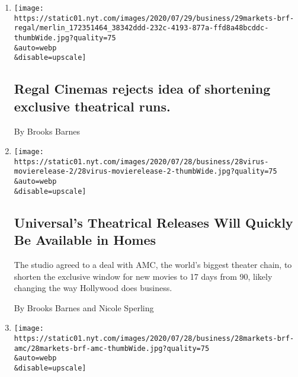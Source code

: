 \begin{enumerate}
\def\labelenumi{\arabic{enumi}.}
\item
  \href{/live/2020/07/29/business/stock-market-today-coronavirus/regal-cinemas-rejects-idea-of-shortening-exclusive-theatrical-runs}{}

  \texttt{[image: https://static01.nyt.com/images/2020/07/29/business/29markets-brf-regal/merlin\_172351464\_38342ddd-232c-4193-877a-ffd8a48bcddc-thumbWide.jpg?quality=75\\\&auto=webp\\\&disable=upscale]}

  \hypertarget{regal-cinemas-rejects-idea-of-shortening-exclusive-theatrical-runs}{%
  \subsection{Regal Cinemas rejects idea of shortening exclusive
  theatrical
  runs.}\label{regal-cinemas-rejects-idea-of-shortening-exclusive-theatrical-runs}}

  By Brooks Barnes
\item
  \href{/2020/07/28/business/media/universal-amc-movies-at-home.html}{}

  \texttt{[image: https://static01.nyt.com/images/2020/07/28/business/28virus-movierelease-2/28virus-movierelease-2-thumbWide.jpg?quality=75\\\&auto=webp\\\&disable=upscale]}

  \hypertarget{universals-theatrical-releases-will-quickly-be-available-in-homes}{%
  \subsection{Universal's Theatrical Releases Will Quickly Be Available
  in
  Homes}\label{universals-theatrical-releases-will-quickly-be-available-in-homes}}

  The studio agreed to a deal with AMC, the world's biggest theater
  chain, to shorten the exclusive window for new movies to 17 days from
  90, likely changing the way Hollywood does business.

  By Brooks Barnes and Nicole Sperling
\item
  \href{/live/2020/07/28/business/stock-market-today-coronavirus/universal-and-amc-agree-to-shorten-the-window-between-theaters-and-streaming}{}

  \texttt{[image: https://static01.nyt.com/images/2020/07/28/business/28markets-brf-amc/28markets-brf-amc-thumbWide.jpg?quality=75\\\&auto=webp\\\&disable=upscale]}

  \hypertarget{universal-and-amc-agree-to-shorten-the-window-between-theaters-and-streaming}{%
}
\end{enumerate}
